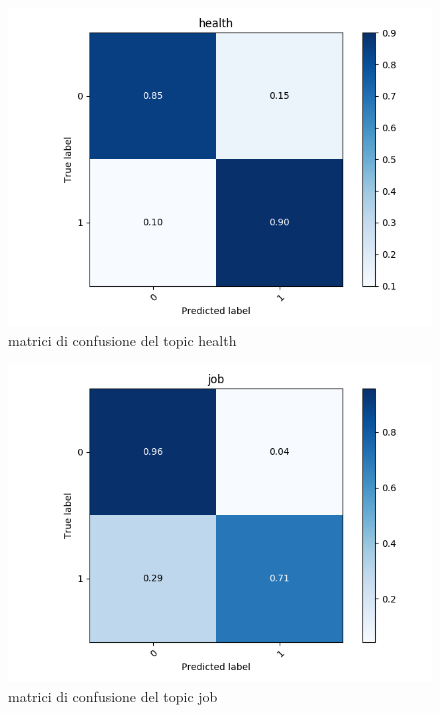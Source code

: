 \begin{figure}[h!t]
    \centering
    \includegraphics{Figure/confMatr/mtr_health.png}
    \caption{matrici di confusione del topic health}
    \label{fig:mtrconf_sim_h}
\end{figure}
\FloatBarrier

\begin{figure}[h!t]
    \centering
    \includegraphics{Figure/confMatr/mtr_job.png}
    \caption{matrici di confusione del topic job}
    \label{fig:mtrconf_sim_j}
\end{figure}
\FloatBarrier


